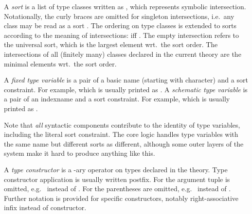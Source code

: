 \begin{isabellebody}
\begin{isamarkuptext}
  A \emph{sort} is a list of type classes written as , which represents symbolic
  intersection.  Notationally, the curly braces are omitted for
  singleton intersections, i.e.\ any class  may be read as
  a sort .  The ordering on type classes is extended to
  sorts according to the meaning of intersections:  iff
  .  The empty intersection
  \isa{{\isacharbraceleft}{\isacharbraceright}} refers to the universal sort, which is the largest
  element wrt.\ the sort order.  The intersections of all (finitely
  many) classes declared in the current theory are the minimal
  elements wrt.\ the sort order.

  \medskip A \emph{fixed type variable} is a pair of a basic name
  (starting with \isa{{\isacharprime}} character) and a sort constraint.  For
  example,  which is usually printed as .  A \emph{schematic type variable} is a pair of an
  indexname and a sort constraint.  For example,  which is usually printed as .

  Note that \emph{all} syntactic components contribute to the identity
  of type variables, including the literal sort constraint.  The core
  logic handles type variables with the same name but different sorts
  as different, although some outer layers of the system make it hard
  to produce anything like this.

  A \emph{type constructor} is a -ary operator on types
  declared in the theory.  Type constructor application is usually
  written postfix.  For  the argument tuple is omitted,
  e.g.\  instead of .  For  the parentheses are omitted, e.g.\  instead of
  .  Further notation is provided for specific
  constructors, notably right-associative infix \isa{{\isasymalpha}\ {\isasymRightarrow}\ {\isasymbeta}}
  instead of  constructor.
  

\end{isamarkuptext}
\end{isabellebody}
